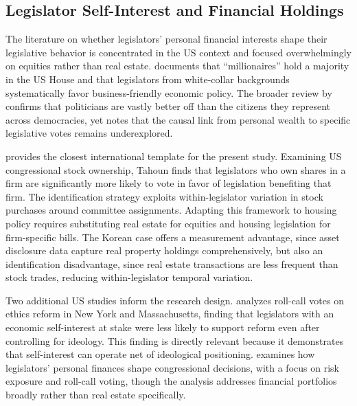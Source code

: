 \documentclass[11pt]{article}
\begin{document}
\subsection{Legislator Self-Interest and Financial Holdings}

The literature on whether legislators' personal financial interests shape their legislative behavior is concentrated in the US context and focused overwhelmingly on equities rather than real estate. \citet{carnes2015} documents that ``millionaires'' hold a majority in the US House and that legislators from white-collar backgrounds systematically favor business-friendly economic policy. The broader review by \citet{carnesLupu2023} confirms that politicians are vastly better off than the citizens they represent across democracies, yet notes that the causal link from personal wealth to specific legislative votes remains underexplored.

\citet{tahoun2014} provides the closest international template for the present study. Examining US congressional stock ownership, Tahoun finds that legislators who own shares in a firm are significantly more likely to vote in favor of legislation benefiting that firm. The identification strategy exploits within-legislator variation in stock purchases around committee assignments. Adapting this framework to housing policy requires substituting real estate for equities and housing legislation for firm-specific bills. The Korean case offers a measurement advantage, since asset disclosure data capture real property holdings comprehensively, but also an identification disadvantage, since real estate transactions are less frequent than stock trades, reducing within-legislator temporal variation.

Two additional US studies inform the research design. \citet{rosenson2003} analyzes roll-call votes on ethics reform in New York and Massachusetts, finding that legislators with an economic self-interest at stake were less likely to support reform even after controlling for ideology. This finding is directly relevant because it demonstrates that self-interest can operate net of ideological positioning. \citet{grose2013} examines how legislators' personal finances shape congressional decisions, with a focus on risk exposure and roll-call voting, though the analysis addresses financial portfolios broadly rather than real estate specifically.
\end{document}
